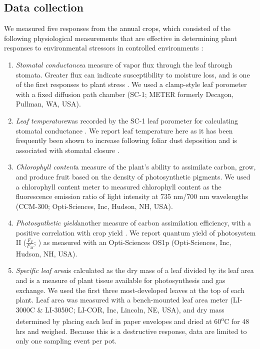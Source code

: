 \documentclass{svjour3}
\begin{document}
\subsection{Data collection} 

We measured five responses from the annual crops, which consisted of the following physiological measurements that are effective in determining plant responses to environmental stressors in controlled environments \citep{mcgranahan2018b}: 
\begin{enumerate}
	\item \emph{Stomatal conductance}\textemdash a measure of vapor flux through the leaf through stomata. 
	Greater flux can indicate susceptibility to moisture loss, and is one of the first responses to plant stress \citep{flexas2002}. 
	We used a clamp-style leaf porometer with a fixed diffusion path chamber (SC-1; METER formerly Decagon, Pullman, WA, USA). 
	\item \emph{Leaf temperature}\textemdash was recorded by the SC-1 leaf porometer for calculating stomatal conductance \citep{metergroup2020}. 
	We report leaf temperature here as it has been frequently been shown to increase following foliar dust deposition and is associated with stomatal closure \citep{eller1977, zia-khan2014}. 
	\item \emph{Chlorophyll content}\textemdash a measure of the plant's ability to assimilate carbon, grow, and produce fruit based on the density of photosynthetic pigments. 
	We used a chlorophyll content meter to measured chlorophyll content as the fluorescence emission ratio of light intensity at 735 nm/700 nm wavelengths
	 (CCM-300; Opti-Sciences, Inc, Hudson, NH, USA).
	\item \emph{Photosynthetic yield}\textemdash another measure of carbon assimilation efficiency, with a positive correlation with crop yield \citep{fischer1998}. 
	We report quantum yield of photosystem II ($\frac{F_{V}}{F_{M}}$;  \citet{kalaji2017}) as measured with an Opti-Sciences OS1p (Opti-Sciences, Inc, Hudson, NH, USA). 
	\item \emph{Specific leaf area}\textemdash is calculated as the dry mass of a leaf divided by its leaf area and is a measure of plant tissue available for photosynthesis and gas exchange. 
	We used the first three most-developed leaves at the top of each plant. 
	Leaf area was measured with a bench-mounted leaf area meter (LI-3000C \& LI-3050C; LI-COR, Inc, Lincoln, NE, USA), and dry mass determined by placing each leaf in paper envelopes and dried at 60\textsuperscript{o}C for 48 hrs and weighed.
	Because this is a destructive response, data are limited to only one sampling event per pot.
\end{enumerate} 
\end{document}
